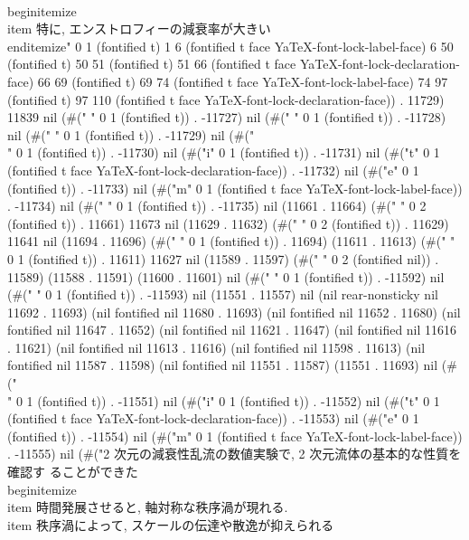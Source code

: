 	\\begin{itemize}
	 \\item 特に, エンストロフィーの減衰率が大きい
	\\end{itemize}" 0 1 (fontified t) 1 6 (fontified t face YaTeX-font-lock-label-face) 6 50 (fontified t) 50 51 (fontified t) 51 66 (fontified t face YaTeX-font-lock-declaration-face) 66 69 (fontified t) 69 74 (fontified t face YaTeX-font-lock-label-face) 74 97 (fontified t) 97 110 (fontified t face YaTeX-font-lock-declaration-face)) . 11729) 11839 nil (#("
" 0 1 (fontified t)) . -11727) nil (#(" " 0 1 (fontified t)) . -11728) nil (#(" " 0 1 (fontified t)) . -11729) nil (#("\\" 0 1 (fontified t)) . -11730) nil (#("i" 0 1 (fontified t)) . -11731) nil (#("t" 0 1 (fontified t face YaTeX-font-lock-declaration-face)) . -11732) nil (#("e" 0 1 (fontified t)) . -11733) nil (#("m" 0 1 (fontified t face YaTeX-font-lock-label-face)) . -11734) nil (#(" " 0 1 (fontified t)) . -11735) nil (11661 . 11664) (#("	 " 0 2 (fontified t)) . 11661) 11673 nil (11629 . 11632) (#("	 " 0 2 (fontified t)) . 11629) 11641 nil (11694 . 11696) (#("	" 0 1 (fontified t)) . 11694) (11611 . 11613) (#("	" 0 1 (fontified t)) . 11611) 11627 nil (11589 . 11597) (#("	 " 0 2 (fontified nil)) . 11589) (11588 . 11591) (11600 . 11601) nil (#("
" 0 1 (fontified t)) . -11592) nil (#("	" 0 1 (fontified t)) . -11593) nil (11551 . 11557) nil (nil rear-nonsticky nil 11692 . 11693) (nil fontified nil 11680 . 11693) (nil fontified nil 11652 . 11680) (nil fontified nil 11647 . 11652) (nil fontified nil 11621 . 11647) (nil fontified nil 11616 . 11621) (nil fontified nil 11613 . 11616) (nil fontified nil 11598 . 11613) (nil fontified nil 11587 . 11598) (nil fontified nil 11551 . 11587) (11551 . 11693) nil (#("\\" 0 1 (fontified t)) . -11551) nil (#("i" 0 1 (fontified t)) . -11552) nil (#("t" 0 1 (fontified t face YaTeX-font-lock-declaration-face)) . -11553) nil (#("e" 0 1 (fontified t)) . -11554) nil (#("m" 0 1 (fontified t face YaTeX-font-lock-label-face)) . -11555) nil (#("2 次元の減衰性乱流の数値実験で, 2 次元流体の基本的な性質を確認す
	ることができた 
	\\begin{itemize}
	 \\item 時間発展させると, 軸対称な秩序渦が現れる.
	 \\item 秩序渦によって, スケールの伝達や散逸が抑えられる
